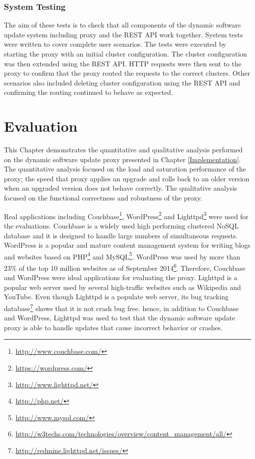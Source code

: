 \documentclass[a4paper,11pt,twoside]{report}
\begin{document}
\subsection{System Testing}
The aim of these tests is to check that all components of the dynamic software update system including proxy and the REST API work together. System tests were written to cover complete user scenarios. The tests were executed by starting the proxy with an initial cluster configuration. The cluster configuration was then extended using the REST API.  HTTP requests were then sent to the proxy to confirm that the proxy routed the requests to the correct clusters.  Other scenarios also included deleting cluster configuration using the REST API and confirming the routing continued to behave as expected.

\clearpage

\chapter{Evaluation}
This Chapter demonstrates the quantitative and qualitative analysis performed on the dynamic software update proxy presented in Chapter \ref{Implementation}. The quantitative analysis focused on the load and saturation performance of the proxy; the speed that proxy applies an upgrade and rolls back to an older version when an upgraded version does not behave correctly. The qualitative analysis focused on the functional correctness and robustness of the proxy. 

Real applications including Couchbase\footnote{\label{couchbase} \url{http://www.couchbase.com/}}, WordPress\footnote{\label{wordpress} \url{https://wordpress.com/}} and Lighttpd\footnote{\label{lighttpd}\url{http://www.lighttpd.net/}} were used for the evaluations. Couchbase is a widely used high performing clustered NoSQL database and it is designed to handle large numbers of  simultaneous requests. WordPress is a popular and mature content management system for writing blogs and websites based on PHP\footnote{\label{PHP}\url{http://php.net/}} and MySQL\footnote{\label{MySQL}\url{http://www.mysql.com/}}. WordPress was used by more than 23\% of the top 10 million websites as of September 2014\footnote{\label{w3techs}\url{http://w3techs.com/technologies/overview/content_management/all/}}. Therefore, Couchbase and WordPress were ideal applications for evaluating the proxy. Lighttpd is a popular web server used by several high-traffic websites such as Wikipedia and YouTube. Even though Lighttpd is a populate web server, its bug tracking database\footnote{\label{redmine}\url{http://redmine.lighttpd.net/issues/}} shows that it is not crash bug free. hence, in addition to Couchbase and WordPress,  Lighttpd was used to test that the dynamic software update proxy is able to handle updates that cause incorrect behavior or crashes.     
\end{document}
